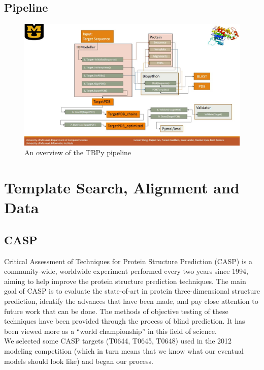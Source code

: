 \documentclass{article}
\begin{document}
\subsection{Pipeline}
\begin{figure}[H]
\begin{center}
\includegraphics[width=\textwidth]{workflow}
\caption{An overview of the TBPy pipeline}
\label{Fig:blosum}
\end{center}
\end{figure}

\section{Template Search, Alignment and Data}

\subsection{CASP}

Critical Assessment of Techniques for Protein Structure Prediction (CASP) is a community-wide, worldwide experiment performed every two years since 1994, aiming to help improve the protein structure prediction techniques. The main goal of CASP is to evaluate the state-of-art in protein three-dimensional structure prediction, identify the advances that have been made, and pay close attention to future work that can be done. The methods of objective testing of these techniques have been provided through the process of blind prediction. It has been viewed more as a “world championship” in this field of science.\\

We selected some CASP targets (T0644, T0645, T0648) used in the 2012 modeling competition (which in turn means that we know what our eventual models should look like) and began our process.
\end{document}
